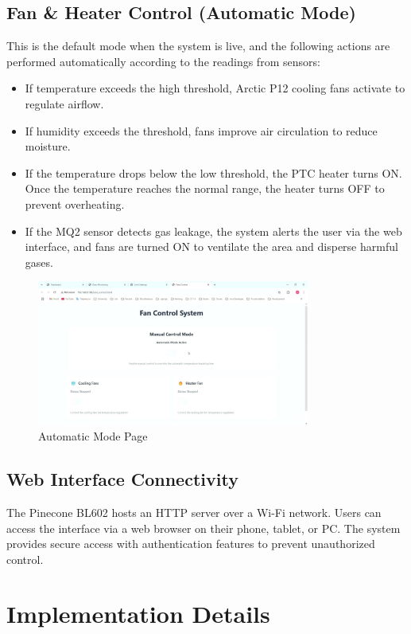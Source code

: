 \documentclass[a4paper]{scrartcl}
\begin{document}
\subsection{Fan \& Heater Control (Automatic Mode)}
This is the default mode when the system is live, and the following actions are performed automatically according to the readings from sensors:
\begin{itemize}
    \item If temperature exceeds the high threshold, Arctic P12 cooling fans activate to regulate airflow.
    \item If humidity exceeds the threshold, fans improve air circulation to reduce moisture.
    \item If the temperature drops below the low threshold, the PTC heater turns ON. Once the temperature reaches the normal range, the heater turns OFF to prevent overheating.
    \item If the MQ2 sensor detects gas leakage, the system alerts the user via the web interface, and fans are turned ON to ventilate the area and disperse harmful gases.
\end{itemize}
\begin{figure}[H]
    \centering
    \includegraphics[width=0.8\textwidth]{images/AM.jpg}
    \caption{Automatic Mode Page}
\end{figure}


\subsection{Web Interface Connectivity}
The Pinecone BL602 hosts an HTTP server over a Wi-Fi network. Users can access the interface via a web browser on their phone, tablet, or PC. The system provides secure access with authentication features to prevent unauthorized control.



\section{Implementation Details}
\end{document}

